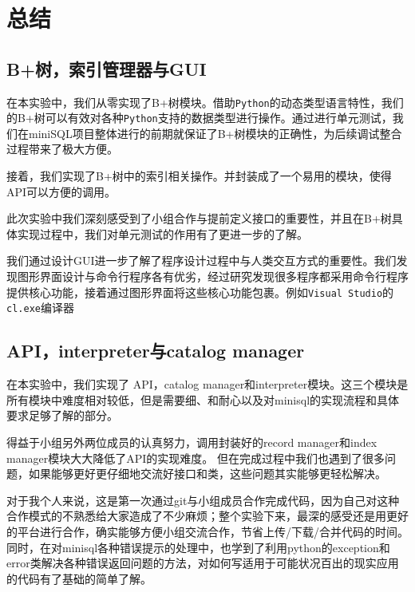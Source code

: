 \documentclass[UTF8]{ctexrep} %
\begin{document}
\chapter{总结}
\section{B+树，索引管理器与GUI}
在本实验中，我们从零实现了B+树模块。借助\texttt{Python}的动态类型语言特性，我们的B+树可以有效对各种\texttt{Python}支持的数据类型进行操作。通过进行单元测试，我们在miniSQL项目整体进行的前期就保证了B+树模块的正确性，为后续调试整合过程带来了极大方便。
\par
接着，我们实现了B+树中的索引相关操作。并封装成了一个易用的模块，使得API可以方便的调用。
\par
此次实验中我们深刻感受到了小组合作与提前定义接口的重要性，并且在B+树具体实现过程中，我们对单元测试的作用有了更进一步的了解。
\par
我们通过设计GUI进一步了解了程序设计过程中与人类交互方式的重要性。我们发现图形界面设计与命令行程序各有优劣，经过研究发现很多程序都采用命令行程序提供核心功能，接着通过图形界面将这些核心功能包裹。例如\texttt{Visual Studio}的\texttt{cl.exe}编译器
\section{API，interpreter与catalog manager}
在本实验中，我们实现了 API，catalog manager和interpreter模块。这三个模块是所有模块中难度相对较低，但是需要细、和耐心以及对minisql的实现流程和具体要求足够了解的部分。
\par
得益于小组另外两位成员的认真努力，调用封装好的record manager和index manager模块大大降低了API的实现难度。 但在完成过程中我们也遇到了很多问题，如果能够更好更仔细地交流好接口和类，这些问题其实能够更轻松解决。
\par
对于我个人来说，这是第一次通过git与小组成员合作完成代码，因为自己对这种合作模式的不熟悉给大家造成了不少麻烦；整个实验下来，最深的感受还是用更好的平台进行合作，确实能够方便小组交流合作，节省上传/下载/合并代码的时间。同时，在对minisql各种错误提示的处理中，也学到了利用python的exception和error类解决各种错误返回问题的方法，对如何写适用于可能状况百出的现实应用的代码有了基础的简单了解。
\end{document}
